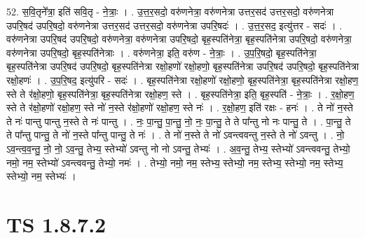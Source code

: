 \documentclass[17pt]{extarticle}
\begin{document}
52. स॒वि॒तृने᳚त्रा॒ इति॑ सवि॒तृ - ने॒त्राः॒ । . उ॒त्त॒र॒सदो॒ वरु॑णनेत्रा॒ वरु॑णनेत्रा उत्तर॒सद॑ उत्तर॒सदो॒ वरु॑णनेत्रा उपरि॒षद॑ उपरि॒षदो॒ वरु॑णनेत्रा उत्तर॒सद॑ उत्तर॒सदो॒ वरु॑णनेत्रा उपरि॒षदः॑ । . उ॒त्त॒र॒सद॒ इत्यु॑त्तर - सदः॑ । . वरु॑णनेत्रा उपरि॒षद॑ उपरि॒षदो॒ वरु॑णनेत्रा॒ वरु॑णनेत्रा उपरि॒षदो॒ बृह॒स्पति॑नेत्रा॒ बृह॒स्पति॑नेत्रा उपरि॒षदो॒ वरु॑णनेत्रा॒ वरु॑णनेत्रा उपरि॒षदो॒ बृह॒स्पति॑नेत्राः । . वरु॑णनेत्रा॒ इति॒ वरु॑ण - ने॒त्राः॒ । . उ॒प॒रि॒षदो॒ बृह॒स्पति॑नेत्रा॒ बृह॒स्पति॑नेत्रा उपरि॒षद॑ उपरि॒षदो॒ बृह॒स्पति॑नेत्रा रक्षो॒हणो॑ रक्षो॒हणो॒ बृह॒स्पति॑नेत्रा उपरि॒षद॑ उपरि॒षदो॒ बृह॒स्पति॑नेत्रा रक्षो॒हणः॑ । . उ॒प॒रि॒षद॒ इत्यु॑परि - सदः॑ । . बृह॒स्पति॑नेत्रा रक्षो॒हणो॑ रक्षो॒हणो॒ बृह॒स्पति॑नेत्रा॒ बृह॒स्पति॑नेत्रा रक्षो॒हण॒ स्ते ते र॑क्षो॒हणो॒ बृह॒स्पति॑नेत्रा॒ बृह॒स्पति॑नेत्रा रक्षो॒हण॒ स्ते । . बृह॒स्पति॑नेत्रा॒ इति॒ बृह॒स्पति॑ - ने॒त्राः॒ । . र॒क्षो॒हण॒ स्ते ते र॑क्षो॒हणो॑ रक्षो॒हण॒ स्ते नो॑ न॒स्ते र॑क्षो॒हणो॑ रक्षो॒हण॒ स्ते नः॑ । . र॒क्षो॒हण॒ इति॑ रक्षः - हनः॑ । . ते नो॑ न॒स्ते ते नः॑ पान्तु पान्तु न॒स्ते ते नः॑ पान्तु । . नः॒ पा॒न्तु॒ पा॒न्तु॒ नो॒ नः॒ पा॒न्तु॒ ते ते पा᳚न्तु नो नः पान्तु॒ ते । . पा॒न्तु॒ ते ते पा᳚न्तु पान्तु॒ ते नो॑ न॒स्ते पा᳚न्तु पान्तु॒ ते नः॑ । . ते नो॑ न॒स्ते ते नो॑ ऽवन्त्ववन्तु न॒स्ते ते नो॑ ऽवन्तु । . नो॒ ऽव॒न्त्व॒व॒न्तु॒ नो॒ नो॒ ऽव॒न्तु॒ तेभ्य॒ स्तेभ्यो॑ ऽवन्तु नो नो ऽवन्तु॒ तेभ्यः॑ । . अ॒व॒न्तु॒ तेभ्य॒ स्तेभ्यो॑ ऽवन्त्ववन्तु॒ तेभ्यो॒ नमो॒ नम॒ स्तेभ्यो॑ ऽवन्त्ववन्तु॒ तेभ्यो॒ नमः॑ । . तेभ्यो॒ नमो॒ नम॒ स्तेभ्य॒ स्तेभ्यो॒ नम॒ स्तेभ्य॒ स्तेभ्यो॒ नम॒ स्तेभ्य॒ स्तेभ्यो॒ नम॒ स्तेभ्यः॑ । \newline
\pagebreak
{}

\section{ TS 1.8.7.2 }
\end{document}
